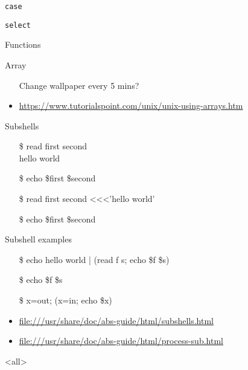 \begin{frame}{\texttt{case}}
  \centering
\end{frame}

\begin{frame}{\texttt{select}}
  \begin{center}
  \end{center}
\end{frame}

\begin{frame}{Functions}
  \centering
\end{frame}

\begin{frame}{Array}
  \centering

  \begin{itemize}
  \item[\hw] Change wallpaper every 5 mins?
  \end{itemize}
\end{frame}

\begin{itemize}
\item \url{https://www.tutorialspoint.com/unix/unix-using-arrays.htm}
\end{itemize}

\begin{frame}{Subshells}\ttfamily
  \begin{itemize}
  \item[\$] read first second\\
    \quad hello world
  \item[\$] echo \$first \$second
  \item[] 
  \item[\$] read first second <<<'hello world'
  \item[\$] echo \$first \$second
  \end{itemize}
  \begin{iblock}{Subshell examples}
    \begin{itemize}
    \item[\$] echo hello world | (read f s; echo \$f \$s)
    \item[\$] echo \$f \$s
    \item[] 
    \item[\$] x=out; (x=in; echo \$x)
    \end{itemize}
  \end{iblock}
\end{frame}

\begin{itemize}
\item \url{file:///usr/share/doc/abs-guide/html/subshells.html}
\item \url{file:///usr/share/doc/abs-guide/html/process-sub.html}
\end{itemize}



\mode<all>
